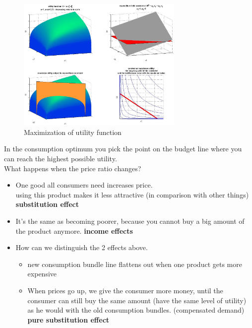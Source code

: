 \documentclass[12pt, a4paper, titlepage]{extarticle}
\begin{document}
	\begin{figure}[h]
	\centering
	    \includegraphics[width=8cm]{utility_drs_cr.jpg}
	    \caption{Maximization of utility function \label{fig:imgMaxUtility}}
	\end{figure}
	In the consumption optimum you pick the point on the budget line where you can reach the highest possible utility.\\ \newline
	What happens when the price ratio changes?\\
	\begin{itemize}
	\item {One good all consumers need increases price. \\ using this product makes it less attractive (in comparison with other things) \textbf{substitution effect}}
	\item{It's the same as becoming poorer, because you cannot buy a big amount of the product anymore. \textbf{income effects}}
	\item{How can we distinguish the 2 effects above.}
	\begin{itemize}
	\item {new consumption bundle line flattens out when one product gets more expensive}
	\item{When prices go up, we give the consumer more money, until the consumer can still buy the same amount (have the same level of utility) as he would with the old consumption bundles. (compensated demand) \textbf{pure substitution effect}}
	\end{itemize}
	\end{itemize}
	
\end{document}
